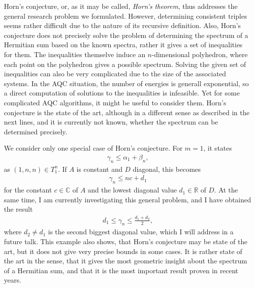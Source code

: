 \documentclass[10pt]{amsart}
\theoremstyle{definition}
\theoremstyle{remark}
\begin{document}
    Horn's conjecture, or, as it may be called, \emph{Horn's theorem}, thus addresses the general research problem we formulated. However, determining consistent triples seems rather difficult due to the nature of its recursive definition. Also, Horn's conjecture does not precisely solve the problem of determining the spectrum of a Hermitian sum based on the known spectra, rather it gives a set of inequalities for them. The inequalities themselve induce an \(n\)-dimensional polyhedron, where each point on the polyhedron gives a possible spectrum. Solving the given set of inequalities can also be very complicated due to the size of the associated systems. In the AQC situation, the number of energies is generall exponential, so a direct computation of solutions to the inequalities is infeasible. Yet for some complicated AQC algorithms, it might be useful to consider them. Horn's conjecture is the state of the art, although in a different sense as described in the next lines, and it is currently not known, whether the spectrum can be determined precisely.

    \phantom{}

    We consider only one special case of Horn's conjecture. For \(m = 1\), it states
    \begin{align}
        \gamma_n \leq \alpha_1 + \beta_n,
    \end{align}
    as \((1, n, n) \in T_1^n\). If \(A\) is constant and \(D\) diagonal, this becomes
    \begin{align}
        \gamma_n \leq nc + d_1
    \end{align}
    for the constant \(c \in \mathbb{C}\) of \(A\) and the lowest diagonal value \(d_1 \in \mathbb{R}\) of \(D\). At the same time, I am currently investigating this general problem, and I have obtained the result
    \begin{align}
        d_1 \leq \gamma_n \leq \frac{d_1+d_2}{2},
    \end{align}
    where \(d_2 \neq d_1\) is the second biggest diagonal value, which I will address in a future talk. This example also shows, that Horn's conjecture may be state of the art, but it does not give very precise bounds in some cases. It is rather state of the art in the sense, that it gives the most geometric insight about the spectrum of a Hermitian sum, and that it is the most important result proven in recent years.
    
    \phantom{}
    
\end{document}

